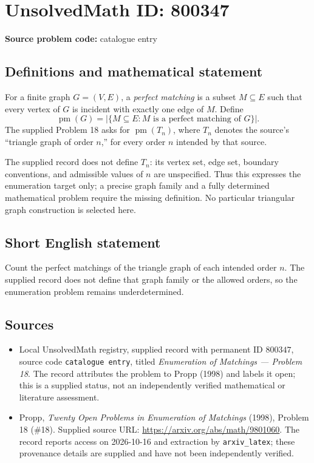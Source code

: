 \documentclass[11pt]{article}
\begin{document}
\section*{UnsolvedMath ID: 800347}
\textbf{Source problem code:} catalogue entry
\subsection{Definitions and mathematical statement}
For a finite graph \(G=(V,E)\), a \emph{perfect matching} is a subset \(M\subseteq E\) such that every vertex of \(G\) is incident with exactly one edge of \(M\). Define
\[
\operatorname{pm}(G)=\left|\{M\subseteq E : M\text{ is a perfect matching of }G\}\right|.
\]
The supplied Problem 18 asks for \(\operatorname{pm}(T_n)\), where \(T_n\) denotes the source's ``triangle graph of order \(n\),'' for every order \(n\) intended by that source.

The supplied record does not define \(T_n\): its vertex set, edge set, boundary conventions, and admissible values of \(n\) are unspecified. Thus this expresses the enumeration target only; a precise graph family and a fully determined mathematical problem require the missing definition. No particular triangular graph construction is selected here.
\subsection{Short English statement}
Count the perfect matchings of the triangle graph of each intended order \(n\). The supplied record does not define that graph family or the allowed orders, so the enumeration problem remains underdetermined.
\subsection{Sources}
\begin{itemize}
\item Local UnsolvedMath registry, supplied record with permanent ID \(800347\), source code \texttt{catalogue entry}, titled \emph{Enumeration of Matchings --- Problem 18}. The record attributes the problem to Propp (1998) and labels it open; this is a supplied status, not an independently verified mathematical or literature assessment.
\item Propp, \emph{Twenty Open Problems in Enumeration of Matchings} (1998), Problem 18 (\#18). Supplied source URL: \url{https://arxiv.org/abs/math/9801060}. The record reports access on 2026-10-16 and extraction by \texttt{arxiv\_latex}; these provenance details are supplied and have not been independently verified.
\end{itemize}
\end{document}
